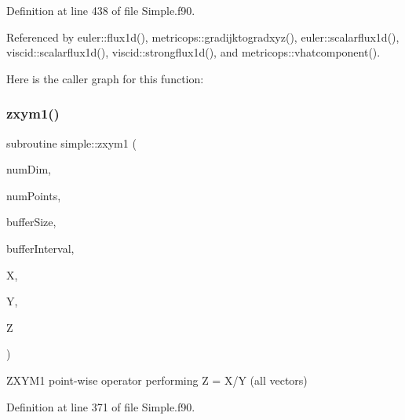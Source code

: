 Definition at line 438 of file Simple.\+f90.



Referenced by euler\+::flux1d(), metricops\+::gradijktogradxyz(), euler\+::scalarflux1d(), viscid\+::scalarflux1d(), viscid\+::strongflux1d(), and metricops\+::vhatcomponent().

Here is the caller graph for this function\+:
\hypertarget{namespacesimple_a783c0ae0645e7495083f8e3e2d978c5d}{}\label{namespacesimple_a783c0ae0645e7495083f8e3e2d978c5d} 
\subsubsection{\texorpdfstring{zxym1()}{zxym1()}}
{\footnotesize\ttfamily subroutine simple\+::zxym1 (\begin{DoxyParamCaption}\item[{integer(kind=4), intent(in)}]{num\+Dim,  }\item[{integer(kind=8), intent(in)}]{num\+Points,  }\item[{integer(kind=8), dimension(numdim), intent(in)}]{buffer\+Size,  }\item[{integer(kind=8), dimension(2$\ast$numdim), intent(in)}]{buffer\+Interval,  }\item[{real(kind=8), dimension(numpoints), intent(in)}]{X,  }\item[{real(kind=8), dimension(numpoints), intent(in)}]{Y,  }\item[{real(kind=8), dimension(numpoints), intent(out)}]{Z }\end{DoxyParamCaption})}



Z\+X\+Y\+M1 point-\/wise operator performing Z = X/Y (all vectors) 



Definition at line 371 of file Simple.\+f90.

